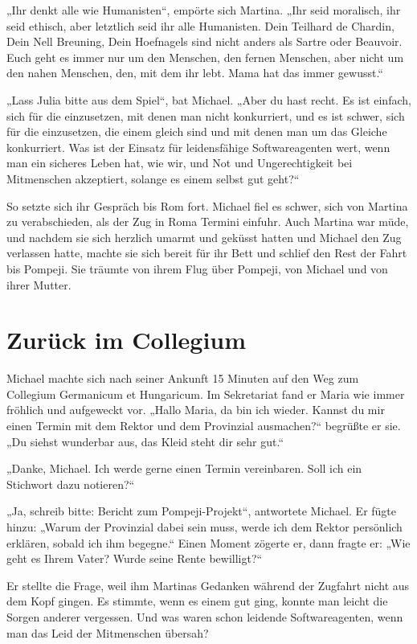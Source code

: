 \documentclass[
]{article}
\begin{document}
„Ihr denkt alle wie Humanisten``, empörte sich Martina. „Ihr seid
moralisch, ihr seid ethisch, aber letztlich seid ihr alle Humanisten.
Dein Teilhard de Chardin, Dein Nell Breuning, Dein Hoefnagels sind nicht
anders als Sartre oder Beauvoir. Euch geht es immer nur um den Menschen,
den fernen Menschen, aber nicht um den nahen Menschen, den, mit dem ihr
lebt. Mama hat das immer gewusst.``

„Lass Julia bitte aus dem Spiel``, bat Michael. „Aber du hast recht. Es
ist einfach, sich für die einzusetzen, mit denen man nicht konkurriert,
und es ist schwer, sich für die einzusetzen, die einem gleich sind und
mit denen man um das Gleiche konkurriert. Was ist der Einsatz für
leidensfähige Softwareagenten wert, wenn man ein sicheres Leben hat, wie
wir, und Not und Ungerechtigkeit bei Mitmenschen akzeptiert, solange es
einem selbst gut geht?{\kern0pt}``

So setzte sich ihr Gespräch bis Rom fort. Michael fiel es schwer, sich
von Martina zu verabschieden, als der Zug in Roma Termini einfuhr. Auch
Martina war müde, und nachdem sie sich herzlich umarmt und geküsst
hatten und Michael den Zug verlassen hatte, machte sie sich bereit für
ihr Bett und schlief den Rest der Fahrt bis Pompeji. Sie träumte von
ihrem Flug über Pompeji, von Michael und von ihrer Mutter.

\section{Zurück im Collegium}\label{zuruxfcck-im-collegium}

Michael machte sich nach seiner Ankunft 15 Minuten auf den Weg zum
Collegium Germanicum et Hungaricum. Im Sekretariat fand er Maria wie
immer fröhlich und aufgeweckt vor. „Hallo Maria, da bin ich wieder.
Kannst du mir einen Termin mit dem Rektor und dem Provinzial
ausmachen?{\kern0pt}`` begrüßte er sie. „Du siehst wunderbar aus, das
Kleid steht dir sehr gut.``

„Danke, Michael. Ich werde gerne einen Termin vereinbaren. Soll ich ein
Stichwort dazu notieren?{\kern0pt}``

„Ja, schreib bitte: Bericht zum Pompeji-Projekt``, antwortete Michael.
Er fügte hinzu: „Warum der Provinzial dabei sein muss, werde ich dem
Rektor persönlich erklären, sobald ich ihm begegne.`` Einen Moment
zögerte er, dann fragte er: „Wie geht es Ihrem Vater? Wurde seine Rente
bewilligt?{\kern0pt}``

Er stellte die Frage, weil ihm Martinas Gedanken während der Zugfahrt
nicht aus dem Kopf gingen. Es stimmte, wenn es einem gut ging, konnte
man leicht die Sorgen anderer vergessen. Und was waren schon leidende
Softwareagenten, wenn man das Leid der Mitmenschen übersah?
\end{document}
